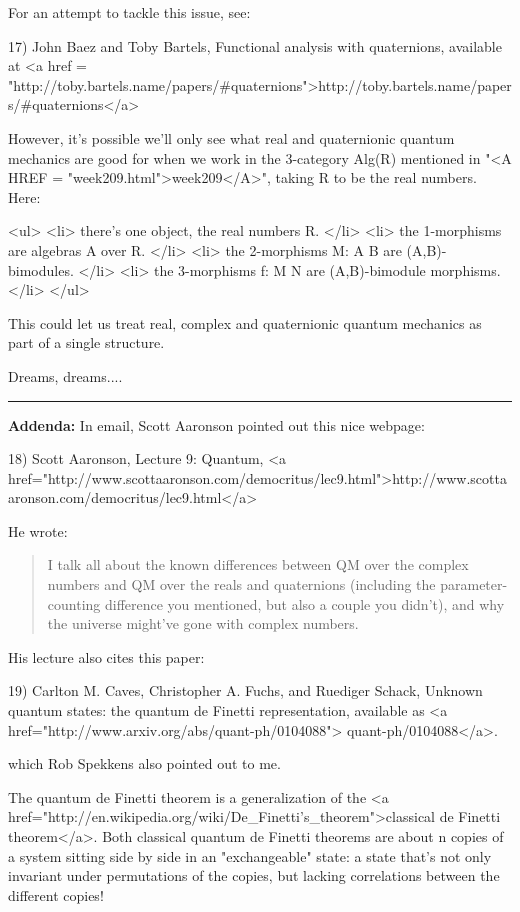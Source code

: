 For an attempt to tackle this issue, see:

17) John Baez and Toby Bartels, Functional analysis with quaternions,
available at <a href = "http://toby.bartels.name/papers/#quaternions">http://toby.bartels.name/papers/#quaternions</a>

However, it's possible we'll only see what real and quaternionic
quantum mechanics are good for when we work in the 3-category Alg(R)
mentioned in "<A HREF = "week209.html">week209</A>", taking
R to be the real numbers.  Here:

<ul>
<li>
there's one object, the real numbers R.
</li>
<li>
the 1-morphisms are algebras A over R.
</li>
<li>
the 2-morphisms M: A \to  B are (A,B)-bimodules.
</li>
<li>
the 3-morphisms f: M \to  N are (A,B)-bimodule morphisms.
</li>
</ul>

This could let us treat real, complex and quaternionic quantum
mechanics as part of a single structure.

Dreams, dreams....

\par\noindent\rule{\textwidth}{0.4pt}
\textbf{Addenda:} In email, Scott Aaronson pointed out this nice webpage:

18) Scott Aaronson, Lecture 9: Quantum, 
<a href="http://www.scottaaronson.com/democritus/lec9.html">http://www.scottaaronson.com/democritus/lec9.html</a>

He wrote:

\begin{quote}

I talk all about the known differences between QM over the complex
numbers and QM over the reals and quaternions (including the
parameter-counting difference you mentioned, but also a couple you
didn't), and why the universe might've gone with complex numbers.

\end{quote}

His lecture also cites this paper:

19) Carlton M. Caves, Christopher A. Fuchs, and Ruediger Schack, 
Unknown quantum states: the quantum de Finetti representation,
available as 
<a href="http://www.arxiv.org/abs/quant-ph/0104088">
quant-ph/0104088</a>.

which Rob Spekkens also pointed out to me.

The quantum de Finetti theorem is a generalization of the 
<a href="http://en.wikipedia.org/wiki/De_Finetti's_theorem">classical 
de Finetti theorem</a>.   Both classical quantum de Finetti theorems 
are about n copies of a system sitting side by side in an 
"exchangeable" state: a state that's not only invariant under 
permutations of the copies, but lacking correlations between the 
different copies!

